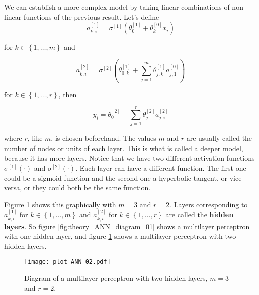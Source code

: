 We can establish a more complex model by taking linear combinations of non-linear functions of the previous result. Let's define
$$
a_{k,i}^{[1]} = \sigma^{[1]} \left( \theta_{0}^{[1]} + \theta_k^{[0]} x_i \right)
$$

for $k \in \left\{ 1, \ldots, m \right\}$ and

$$
  a_{k,i}^{[2]} = \sigma^{[2]} \left(  \theta_{0,k}^{[1]} + \sum_{j = 1}^m \theta_{j,k}^{[1]} a_{j,1}^{[0]}  \right)
$$


for $k \in \left\{ 1, \ldots, r \right\}$, then

$$
  y_i = \theta_0^{[2]} + \sum_{j = 1}^r \theta_j^{[2]} a_{j,i}^{[2]}
$$

where $r$, like $m$, is chosen beforehand. The values $m$ and $r$ are usually called the number of nodes or units of each layer. This is what is called a deeper model, because it has more layers. Notice that we have two different activation functions $\sigma^{[1]}(\cdot)$ and $\sigma^{[2]}(\cdot)$. Each layer can have a different function. The first one could be a sigmoid function and the second one a hyperbolic tangent, or vice versa, or they could both be the same function.

Figure \ref{fig:theory_ANN_diagram_02} shows this graphically with $m = 3$ and $r = 2$. Layers corresponding to $a_{k,i}^{[1]}$ for $k \in \left\{ 1, \ldots, m \right\}$ and $a_{k,i}^{[2]}$ for $k \in \left\{ 1, \ldots, r \right\}$ are called the \textbf{hidden layers}. So figure \ref{fig:theory_ANN_diagram_01} shows a multilayer perceptron with one hidden layer, and figure \ref{fig:theory_ANN_diagram_02} shows a multilayer perceptron with two hidden layers.


\begin{figure}[H]
    \centering
    \texttt{[image: plot\_ANN\_02.pdf]}
    \caption{Diagram of a multilayer perceptron with two hidden layers, $m = 3$ and $r = 2$.}
    \label{fig:theory_ANN_diagram_02}
\end{figure}


